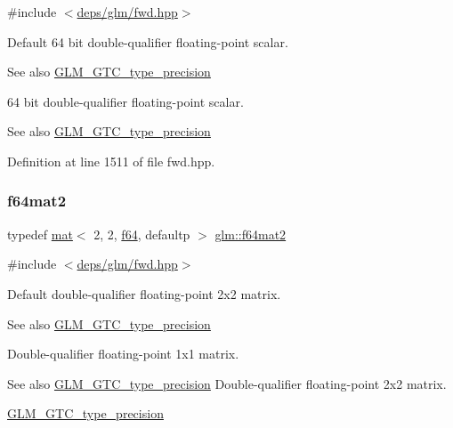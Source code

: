 {\ttfamily \#include $<$\hyperlink{fwd_8hpp}{deps/glm/fwd.\+hpp}$>$}

Default 64 bit double-\/qualifier floating-\/point scalar. \begin{DoxySeeAlso}{See also}
\hyperlink{group__gtc__type__precision}{G\+L\+M\+\_\+\+G\+T\+C\+\_\+type\+\_\+precision}
\end{DoxySeeAlso}
64 bit double-\/qualifier floating-\/point scalar. \begin{DoxySeeAlso}{See also}
\hyperlink{group__gtc__type__precision}{G\+L\+M\+\_\+\+G\+T\+C\+\_\+type\+\_\+precision} 
\end{DoxySeeAlso}


Definition at line 1511 of file fwd.\+hpp.

\mbox{\label{group__gtc__type__precision_ga477d3143dab8df258829c0eaf3067770}} 
\subsubsection{\texorpdfstring{f64mat2}{f64mat2}}
{\footnotesize\ttfamily typedef \hyperlink{structglm_1_1mat}{mat}$<$ 2, 2, \hyperlink{group__gtc__type__precision_ga2bba392e555124b36cde6abba349bab3}{f64}, defaultp $>$ \hyperlink{group__gtc__type__precision_ga477d3143dab8df258829c0eaf3067770}{glm\+::f64mat2}}



{\ttfamily \#include $<$\hyperlink{fwd_8hpp}{deps/glm/fwd.\+hpp}$>$}

Default double-\/qualifier floating-\/point 2x2 matrix. \begin{DoxySeeAlso}{See also}
\hyperlink{group__gtc__type__precision}{G\+L\+M\+\_\+\+G\+T\+C\+\_\+type\+\_\+precision}
\end{DoxySeeAlso}
Double-\/qualifier floating-\/point 1x1 matrix. \begin{DoxySeeAlso}{See also}
\hyperlink{group__gtc__type__precision}{G\+L\+M\+\_\+\+G\+T\+C\+\_\+type\+\_\+precision} Double-\/qualifier floating-\/point 2x2 matrix. 

\hyperlink{group__gtc__type__precision}{G\+L\+M\+\_\+\+G\+T\+C\+\_\+type\+\_\+precision} 
\end{DoxySeeAlso}


